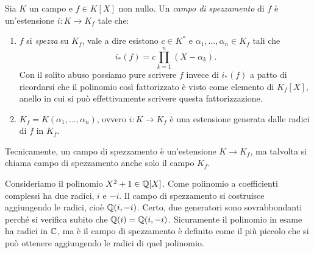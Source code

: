 \begin{defi}
Sia $K$ un campo e $f \in K[X]$ non nullo. Un {\em campo di spezzamento} di $f$ è un'estensione $i : K \to K_f$ tale che:
\begin{enumerate}
\item $f$ si {\em spezza} su $K_f$, vale a dire esistono $c \in K^\ast$ e $\alpha_1, \dots{}, \alpha_n \in K_f$ tali che 
\[i_\ast (f) = c\prod_{k=1}^n(X-\alpha_k) .\]
Con il solito abuso possiamo pure scrivere $f$ invece di $i_\ast(f)$ a patto di ricordarsi che il polinomio così fattorizzato è visto come elemento di $K_f[X]$, anello in cui si può effettivamente scrivere questa fattorizzazione.
\item $K_f = K\left( \alpha_1, \dots{}, \alpha_n \right)$, ovvero $i : K \to K_f$ è una estensione generata dalle radici di $f$ in $K_f$.
\end{enumerate}
Tecnicamente, un campo di spezzamento è un'estensione $K \to K_f$, ma talvolta si chiama campo di spezzamento anche solo il campo $K_f$.
\end{defi}



\begin{esem}
Consideriamo il polinomio $X^2+1 \in \mathbb{Q}[X]$. Come polinomio a coefficienti complessi ha due radici, $i$ e $-i$. Il campo di spezzamento si costruisce aggiungendo le radici, cioè $\mathbb{Q}(i, -i)$. Certo, due generatori sono sovrabbondanti perché si verifica subito che $\mathbb{Q}(i) = \mathbb{Q}(i, -i)$. Sicuramente il polinomio in esame ha radici in $\mathbb{C}$, ma è il campo di spezzamento è definito come il più piccolo che si può ottenere aggiungendo le radici di quel polinomio.
\end{esem}


